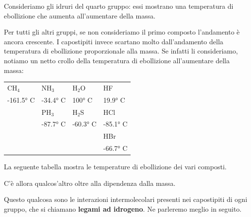 Consideriamo gli idruri del quarto gruppo: essi mostrano una temperatura di ebollizione che aumenta all'aumentare della massa.

Per tutti gli altri gruppi, se non consideriamo il primo composto l'andamento è ancora crescente. I capostipiti invece scartano molto dall'andamento della temperatura di ebollizione proporzionale alla massa. Se infatti li consideriamo, notiamo un netto crollo della temperatura di ebollizione all'aumentare della massa:

\begin{center}
    \begin{tabular}{m{2cm}m{2cm}m{2cm}m{2cm}}
    CH$_4$ & NH$_3$ & H$_2$O & HF\\[0.8ex]
    \hspace{-0.4cm}-161.5° C & \hspace{-0.3cm}-34.4° C & \hspace{-0.2cm}100° C & \hspace{-0.3cm}19.9° C\\[0.8ex]
    & PH$_3$ & H$_2$S & HCl\\[0.8ex]
    & \hspace{-0.3cm}-87.7° C & \hspace{-0.3cm}-60.3° C & \hspace{-0.3cm}-85.1° C\\[0.8ex]
    &&& HBr\\[0.8ex]
    &&& \hspace{-0.3cm}-66.7° C
    \end{tabular}
\end{center}

La seguente tabella mostra le temperature di ebollizione dei vari composti.

\vspace{0.2cm}C'è allora qualcos'altro oltre alla dipendenza dalla massa.

Questo qualcosa sono le interazioni intermolecolari presenti nei capostipiti di ogni gruppo, che si chiamano \textbf{legami ad idrogeno}. Ne parleremo meglio in seguito.

